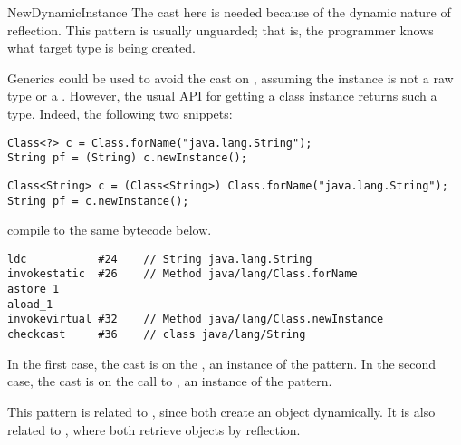 \begin{pattern}{NewDynamicInstance}
\issues{}
The cast here is needed because of the dynamic nature of reflection.
This pattern is usually unguarded; that is,
the programmer knows what target type is being created.

Generics could be used to avoid the cast on , assuming the  instance is 
not a raw type or a .
However, the usual API for getting a class instance 
returns such a type.
Indeed, the following two snippets:

\begin{verbatim}
Class<?> c = Class.forName("java.lang.String");
String pf = (String) c.newInstance();
\end{verbatim}

\begin{verbatim}
Class<String> c = (Class<String>) Class.forName("java.lang.String");
String pf = c.newInstance();
\end{verbatim}

compile to the same bytecode below.

\begin{listing}
\begin{verbatim}
ldc           #24    // String java.lang.String
invokestatic  #26    // Method java/lang/Class.forName
astore_1
aload_1
invokevirtual #32    // Method java/lang/Class.newInstance
checkcast     #36    // class java/lang/String
\end{verbatim}
\end{listing}

In the first case, the cast is on the , an instance of the
\thisp{} pattern. In the second case, the cast is on the call to
, an instance of the  pattern.

This pattern is related to ,
since both create an object dynamically.
It is also related to ,
where both retrieve objects by reflection.

\end{pattern}